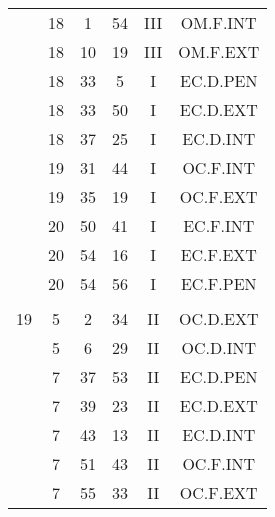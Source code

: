 \documentclass[12pt, a4paper]{article}
\begin{document}
\begin{multicols}{3}
{\begin{tabular}{c c c c c c}
	 	 	 	 & 18 & 1 & 54 & III & OM.F.INT\\%
	 	 	 	 & 18 & 10 & 19 & III & OM.F.EXT\\%
	 	 	 	 & 18 & 33 & 5 & I & EC.D.PEN\\%
	 	 	 	 & 18 & 33 & 50 & I & EC.D.EXT\\%
	 	 	 	 & 18 & 37 & 25 & I & EC.D.INT\\%
	 	 	 	 & 19 & 31 & 44 & I & OC.F.INT\\%
	 	 	 	 & 19 & 35 & 19 & I & OC.F.EXT\\%
	 	 	 	 & 20 & 50 & 41 & I & EC.F.INT\\%
	 	 	 	 & 20 & 54 & 16 & I & EC.F.EXT\\%
	 	 	 	 & 20 & 54 & 56 & I & EC.F.PEN\\%
	 	 	 	 & & & & & \\%
	 	 	 	19 & 5 & 2 & 34 & II & OC.D.EXT\\%
	 	 	 	 & 5 & 6 & 29 & II & OC.D.INT\\%
	 	 	 	 & 7 & 37 & 53 & II & EC.D.PEN\\%
	 	 	 	 & 7 & 39 & 23 & II & EC.D.EXT\\%
	 	 	 	 & 7 & 43 & 13 & II & EC.D.INT\\%
	 	 	 	 & 7 & 51 & 43 & II & OC.F.INT\\%
	 	 	 	 & 7 & 55 & 33 & II & OC.F.EXT\\%
	 	 \end{tabular}
 	}
\end{multicols}
\end{document}
